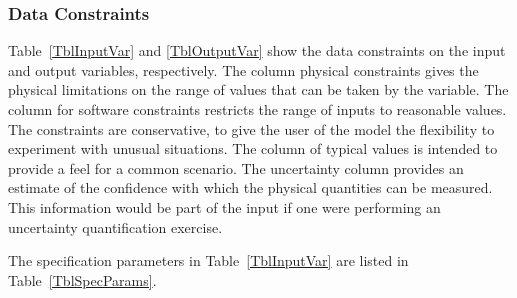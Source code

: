 \documentclass[12pt]{article}
\newcommand{\ddref}[1]{DD\ref{#1}}
\newcommand{\aref}[1]{A\ref{#1}}
\newcommand{\iref}[1]{IM\ref{#1}}
\begin{document}

\subsubsection{Data Constraints} \label{sec_DataConstraints}    

Table~\ref{TblInputVar} and \ref{TblOutputVar} show the data constraints on the
input and output variables, respectively.  The column physical constraints gives
the physical limitations on the range of values that can be taken by the
variable.  The column for software constraints restricts the range of inputs to
reasonable values.  The constraints are conservative, to give the user of the
model the flexibility to experiment with unusual situations.  The column of
typical values is intended to provide a feel for a common scenario.  The
uncertainty column provides an estimate of the confidence with which the
physical quantities can be measured.  This information would be part of the
input if one were performing an uncertainty quantification exercise.

The specification parameters in Table~\ref{TblInputVar} are listed in
Table~\ref{TblSpecParams}.
\end{document}
